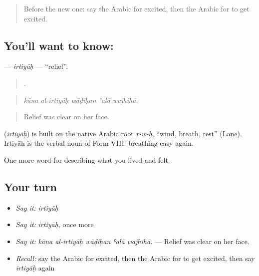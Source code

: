 \label{lesson:AR-C496-irtiyah}



\begin{quote}
Before the new one: say the Arabic for excited, then the Arabic for to get excited.
\end{quote}

\subsection*{You'll want to know: }
\textbf{} — \emph{irtiyāḥ} — \textquotedblleft{}relief\textquotedblright{}.

\begin{quote}
    .
\end{quote}

\begin{quote}
\emph{kāna al-irtiyāḥ wāḍiḥan ʿalā wajhihā.}
\end{quote}

\begin{quote}
Relief was clear on her face.
\end{quote}

\begin{cousinweb}
\textbf{} (\emph{irtiyāḥ}) is built on the native Arabic root \emph{r-w-ḥ}, \textquotedblleft{}wind, breath, rest\textquotedblright{} (Lane). Irtiyāḥ is the verbal noun of Form VIII: breathing easy again.
\end{cousinweb}

\begin{grammarlens}[title={What you've built}]
One more word for describing what you lived and felt.
\end{grammarlens}

\subsection*{Your turn}
\begin{itemize}
\raggedright
  \item \emph{Say it:} \emph{irtiyāḥ}
  \item \emph{Say it:} \emph{irtiyāḥ}, once more
  \item \emph{Say it:} \emph{kāna al-irtiyāḥ wāḍiḥan ʿalā wajhihā.} — Relief was clear on her face.
  \item \emph{Recall:} say the Arabic for excited, then the Arabic for to get excited, then say \emph{irtiyāḥ} again
\end{itemize}

